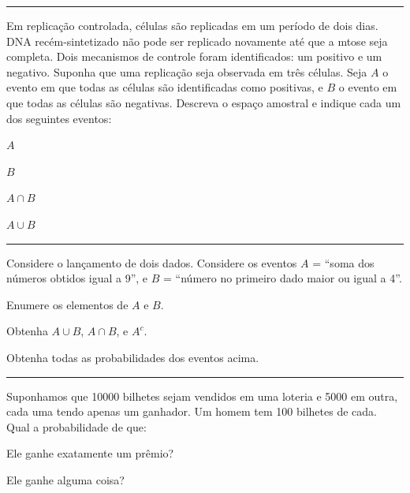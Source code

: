 \documentclass[a4paper,11pt,fleqn]{article}\usepackage[]{graphicx}\usepackage[]{color}
\theoremstyle{definition}
\begin{document}
\begin{compactenum}
\vspace{0.3cm}
\hrule
\vspace{0.3cm}

\item Em replicação controlada, células são replicadas em um período de
  dois dias. DNA recém-sintetizado não pode ser replicado novamente até
  que a mtose seja completa. Dois mecanismos de controle foram
  identificados: um positivo e um negativo. Suponha que uma replicação
  seja observada em três células. Seja $A$ o evento em que todas as
  células são identificadas como positivas, e $B$ o evento em que todas
  as células são negativas. Descreva o espaço amostral e indique cada um
  dos seguintes eventos: \\
  \begin{inparaenum}
  \item $A$ \,
  \item $B$ \,
  \item $A \cap B$ \,
  \item $A \cup B$
  \end{inparaenum}

\vspace{0.3cm}
\hrule
\vspace{0.3cm}

\item Considere o lançamento de dois dados. Considere os eventos $A$ =
  ``soma dos números obtidos igual a 9'', e $B$ = ``número no primeiro
  dado maior ou igual a 4''.
  \begin{compactenum}
  \item Enumere os elementos de $A$ e $B$.
  \item Obtenha $A \cup B$, $A \cap B$, e $A^{c}$.
  \item Obtenha todas as probabilidades dos eventos acima.
  \end{compactenum}

\vspace{0.3cm}
\hrule
\vspace{0.3cm}

\item Suponhamos que 10000 bilhetes sejam vendidos em uma loteria e 5000
  em outra, cada uma tendo apenas um ganhador. Um homem tem 100 bilhetes
  de cada. Qual a probabilidade de que:
  \begin{compactenum}
  \item Ele ganhe exatamente um prêmio?
  \item Ele ganhe alguma coisa?
  \end{compactenum}


\end{compactenum}
\end{document}
